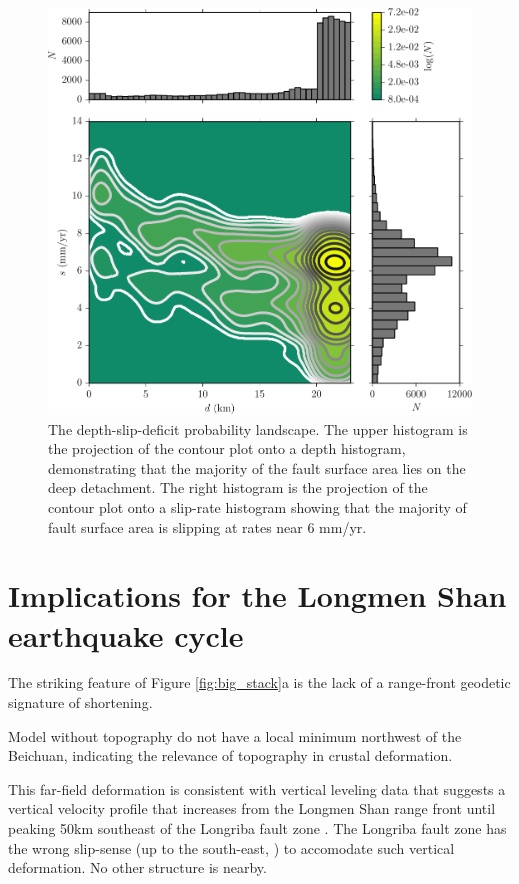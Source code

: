 \documentclass[12pt]{article}
\begin{document}
\begin{figure}[h!]
    \centering
    \includegraphics{figs/depth_slip_contour.pdf}
    \caption{The depth-slip-deficit probability landscape. The upper histogram is the projection of the contour plot onto a depth histogram, demonstrating that the majority of the fault surface area lies on the deep detachment. The right histogram is the projection of the contour plot onto a slip-rate histogram showing that the majority of fault surface area is slipping at rates near 6 mm/yr.}
    \label{fig:distribution}
\end{figure}

\section{Implications for the Longmen Shan earthquake cycle}
The striking feature of Figure \ref{fig:big_stack}a is the lack of a range-front geodetic signature of shortening. 

Model without topography do not have a local minimum northwest of the Beichuan, indicating the relevance of topography in crustal deformation.

This far-field deformation is consistent with vertical leveling data that suggests a vertical velocity profile that increases from the Longmen Shan range front until peaking 50km southeast of the Longriba fault zone \citep{Hao2014}. The Longriba fault zone has the wrong slip-sense (up to the south-east, \citep{Ren2013}) to accomodate such vertical deformation. No other structure is nearby. 
\end{document}
